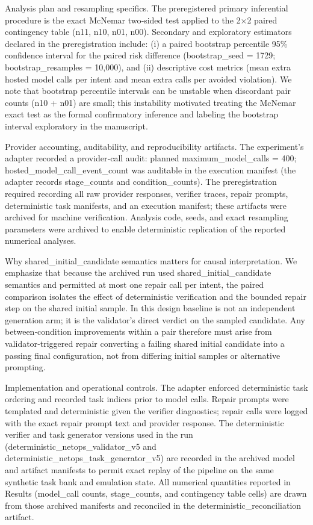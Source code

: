 \documentclass[conference]{IEEEtran}
\begin{document}
Analysis plan and resampling specifics. The preregistered primary inferential procedure is the exact McNemar two‑sided test applied to the 2\ensuremath{\times}2 paired contingency table (n11, n10, n01, n00). Secondary and exploratory estimators declared in the preregistration include: (i) a paired bootstrap percentile 95\% confidence interval for the paired risk difference (bootstrap\_seed = 1729; bootstrap\_resamples = 10,000), and (ii) descriptive cost metrics (mean extra hosted model calls per intent and mean extra calls per avoided violation). We note that bootstrap percentile intervals can be unstable when discordant pair counts (n10 + n01) are small; this instability motivated treating the McNemar exact test as the formal confirmatory inference and labeling the bootstrap interval exploratory in the manuscript.

Provider accounting, auditability, and reproducibility artifacts. The experiment's adapter recorded a provider‑call audit: planned maximum\_model\_calls = 400; hosted\_model\_call\_event\_count was auditable in the execution manifest (the adapter records stage\_counts and condition\_counts). The preregistration required recording all raw provider responses, verifier traces, repair prompts, deterministic task manifests, and an execution manifest; these artifacts were archived for machine verification. Analysis code, seeds, and exact resampling parameters were archived to enable deterministic replication of the reported numerical analyses.

Why shared\_initial\_candidate semantics matters for causal interpretation. We emphasize that because the archived run used shared\_initial\_candidate semantics and permitted at most one repair call per intent, the paired comparison isolates the effect of deterministic verification and the bounded repair step on the shared initial sample. In this design baseline is not an independent generation arm; it is the validator's direct verdict on the sampled candidate. Any between‑condition improvements within a pair therefore must arise from validator‑triggered repair converting a failing shared initial candidate into a passing final configuration, not from differing initial samples or alternative prompting.

Implementation and operational controls. The adapter enforced deterministic task ordering and recorded task indices prior to model calls. Repair prompts were templated and deterministic given the verifier diagnostics; repair calls were logged with the exact repair prompt text and provider response. The deterministic verifier and task generator versions used in the run (deterministic\_netops\_validator\_v5 and deterministic\_netops\_task\_generator\_v5) are recorded in the archived model and artifact manifests to permit exact replay of the pipeline on the same synthetic task bank and emulation state. All numerical quantities reported in Results (model\_call counts, stage\_counts, and contingency table cells) are drawn from those archived manifests and reconciled in the deterministic\_reconciliation artifact.
\end{document}
